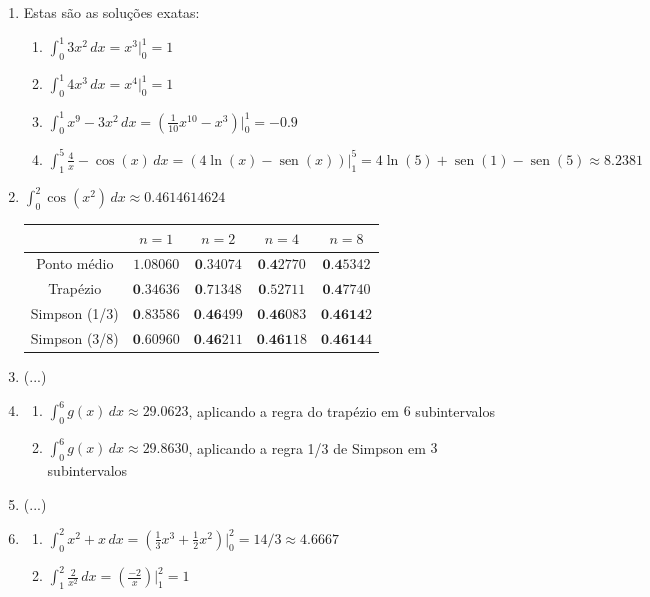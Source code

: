 \documentclass[12pt,a4paper]{article}
\newcommand{\fixme}{{\color{red}(...)}}
\newcommand*\sen{\operatorname{sen}}
\begin{document}
\begin{enumerate}
\item Estas são as soluções exatas:
\begin{enumerate}
\item $\int_0^1 3x^2 \,dx = x^3 \Big|_0^1 = 1$
\item $\int_0^1 4x^3 \,dx = x^4 \Big|_0^1 = 1$
\item $\int_0^1 x^9 - 3x^2 \,dx= \left(\frac{1}{10}x^{10} - x^3\right) \Big|_0^1 = -0.9$
\item $\int_1^5 \frac{4}{x} - \cos(x) \,dx = \left( 4\ln(x) - \sen(x)\right) \Big|_1^5 = 4\ln(5) + \sen(1) - \sen(5) \approx 8.2381$
\end{enumerate}
\item $\int_0^2 \cos(x^2)\, dx \approx 0.4614614624$
\begin{center}
\begin{tabular}{|c|c|c|c|c|}
\hline
              & $n=1$     & $n=2$    & $n=4$   & $n=8$ \\ \hline
Ponto médio   & $1.08060$ & $\textbf{0}.34074$ & $\textbf{0.4}2770$ & $\textbf{0.4}5342$ \\ \hline
Trapézio      & $\textbf{0}.34636$ & $\textbf{0}.71348$ & $\textbf{0}.52711$ & $\textbf{0.4}7740$ \\ \hline
Simpson (1/3) & $\textbf{0}.83586$ & $\textbf{0.46}499$ & $\textbf{0.46}083$ & $\textbf{0.4614}2$ \\ \hline
Simpson (3/8) & $\textbf{0}.60960$ & $\textbf{0.46}211$ & $\textbf{0.461}18$ & $\textbf{0.4614}4$ \\ \hline
\end{tabular}
\end{center}
\item \fixme
\item
\begin{enumerate}
\item $\int_0^6 g(x)\,dx \approx 29.0623$, aplicando a regra do trapézio em $6$ subintervalos
\item $\int_0^6 g(x)\,dx \approx 29.8630$, aplicando a regra 1/3 de Simpson em $3$ subintervalos
\end{enumerate}
\item \fixme
\item
\begin{enumerate}
\item $\int_0^2 x^2 + x\,dx = \left( \frac{1}{3}x^3 +\frac{1}{2}x^2 \right)\Big|_0^2 = 14/3 \approx 4.6667$
\item $\int_1^2 \frac{2}{x^2}\,dx = \left( \frac{-2}{x} \right)\Big|_1^2 = 1$

\end{enumerate}
\end{enumerate}
\end{document}
